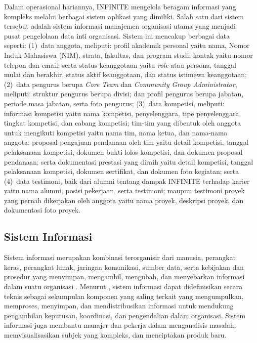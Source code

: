 Dalam operasional hariannya, INFINITE mengelola beragam informasi yang kompleks melalui berbagai sistem aplikasi yang dimiliki. Salah satu dari sistem tersebut adalah sistem informasi manajemen organisasi utama yang menjadi pusat pengelolaan data inti organisasi. Sistem ini mencakup berbagai data seperti: (1)~data anggota, meliputi: profil akademik personal yaitu nama, Nomor Induk Mahasiswa (NIM), strata, fakultas, dan program studi; kontak yaitu nomor telepon dan email; serta status keanggotaan yaitu \textit{role} atau persona, tanggal mulai dan berakhir, status aktif keanggotaan, dan status istimewa keanggotaan; (2)~data pengurus berupa \textit{Core Team} dan \textit{Community Group Administrator}, meliputi: struktur pengurus berupa divisi; dan profil pengurus berupa jabatan, periode masa jabatan, serta foto pengurus; (3)~data kompetisi, meliputi: informasi kompetisi yaitu nama kompetisi, penyelenggara, tipe penyelenggara, tingkat kompetisi, dan cabang kompetisi; tim-tim yang dibentuk oleh anggota untuk mengikuti kompetisi yaitu nama tim, nama ketua, dan nama-nama anggota; proposal pengajuan pendanaan oleh tim yaitu detail kompetisi, tanggal pelaksanaan kompetisi, dokumen bukti lolos kompetisi, dan dokumen proposal pendanaan; serta dokumentasi prestasi yang diraih yaitu detail kompetisi, tanggal pelaksanaan kompetisi, dokumen sertifikat, dan dokumen foto kegiatan; serta (4)~data testimoni, baik dari alumni tentang dampak INFINITE terhadap karier yaitu nama alumni, posisi pekerjaan, serta testimoni; maupun testimoni proyek yang pernah dikerjakan oleh anggota yaitu nama proyek, deskripsi proyek, dan dokumentasi foto proyek.

\subsection{Sistem Informasi}

Sistem informasi merupakan kombinasi terorganisir dari manusia, perangkat keras, perangkat lunak, jaringan komunikasi, sumber data, serta kebijakan dan prosedur yang menyimpan, mengambil, mengubah, dan menyebarkan informasi dalam suatu organisasi \citep{OBrien_2012_MIS}. Menurut \citet{Laudon_2020_MIS}, sistem informasi dapat didefinisikan secara teknis sebagai sekumpulan komponen yang saling terkait yang mengumpulkan, memproses, menyimpan, dan mendistribusikan informasi untuk mendukung pengambilan keputusan, koordinasi, dan pengendalian dalam organisasi. Sistem informasi juga membantu manajer dan pekerja dalam menganalisis masalah, memvisualisasikan subjek yang kompleks, dan menciptakan produk baru.

